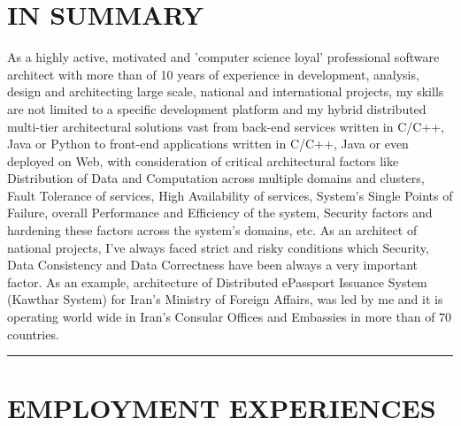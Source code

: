 \documentclass[10pt,a4paper]{article}
\begin{document}
\thispagestyle{fancy}

\section{IN SUMMARY}
As a highly active, motivated and 'computer science loyal' professional software architect with more than of 10 years of experience in development, analysis, design and architecting large scale, national and international projects, my skills are not limited to a specific development platform and my hybrid distributed multi-tier architectural solutions vast from back-end services written in C/C++, Java or Python to front-end applications written in C/C++, Java or even deployed on Web, with consideration of critical architectural factors like Distribution of Data and Computation across multiple domains and clusters, Fault Tolerance of services, High Availability of services, System's Single Points of Failure, overall Performance and Efficiency of the system, Security factors and hardening these factors across the system's domains, etc. As an architect of national projects, I've always faced strict and risky conditions which Security, Data Consistency and Data Correctness have been always a very important factor. As an example, architecture of Distributed ePassport Issuance System (Kawthar System) for Iran's Ministry of Foreign Affairs, was led by me and it is operating world wide in Iran's Consular Offices and Embassies in more than of 70 countries.

\rule {15cm}{0.4pt}

\section{EMPLOYMENT EXPERIENCES}
\end{document}
